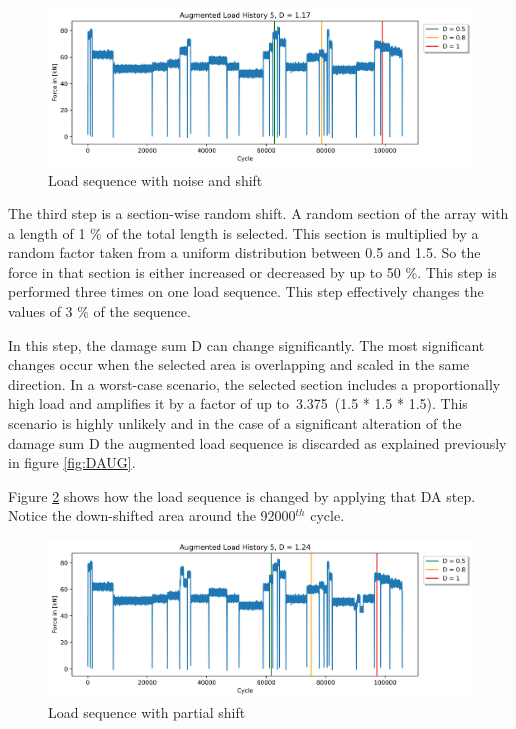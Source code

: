 \begin{figure}[H]
	\centering
	\includegraphics[width=1\linewidth]{IMGs/Verlauf_5_noise.jpg}
	\caption{Load sequence with noise and shift}
	\label{fig:V5_shift}
\end{figure}

The third step is a section-wise random shift. A random section of the array with a length of 1 \% of the total length is selected. This section is multiplied by a random factor taken from a uniform distribution between 0.5 and 1.5. So the force in that section is either increased or decreased by up to 50 \%. This step is performed three times on one load sequence. This step effectively changes the values of 3 \% of the sequence.  

In this step, the damage sum D can change significantly. The most significant changes occur when the selected area is overlapping and scaled in the same direction. In a worst-case scenario, the selected section includes a proportionally high load and amplifies it by a factor of up to~3.375~(1.5 * 1.5 * 1.5). This scenario is highly unlikely and in the case of a significant alteration of the damage sum D the augmented load sequence is discarded as explained previously in figure \ref{fig:DAUG}.
 
Figure \ref{fig:Verlauf_5_shift_partial} shows how the load sequence is changed by applying that DA step. Notice the down-shifted area around the 92000\(^{th}\) cycle.


\begin{figure}[H]
	\centering
	\includegraphics[width=1\linewidth]{IMGs/Verlauf_5_shift_partial.jpg}
	\caption{Load sequence with partial shift}
	\label{fig:Verlauf_5_shift_partial}
\end{figure}

